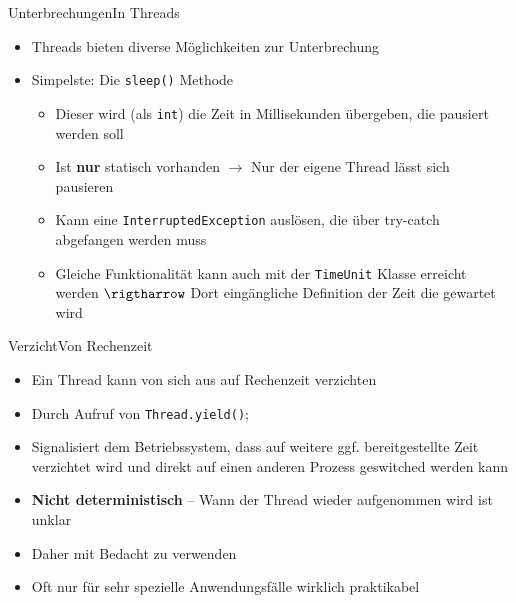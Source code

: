 \begin{frame}{Unterbrechungen}{In Threads}
    \begin{itemize}
        \item Threads bieten diverse Möglichkeiten zur Unterbrechung
        \item Simpelste: Die \texttt{sleep()} Methode
        \begin{itemize}
            \item Dieser wird (als \texttt{int}) die Zeit in Millisekunden übergeben, die pausiert werden soll
            \item Ist \textbf{nur} statisch vorhanden $\rightarrow$ Nur der eigene Thread lässt sich pausieren
            \item Kann eine \texttt{InterruptedException} auslösen, die über try-catch abgefangen werden muss
            \item Gleiche Funktionalität kann auch mit der \texttt{TimeUnit} Klasse erreicht werden $\rigtharrow$ Dort eingängliche Definition der Zeit die gewartet wird
        \end{itemize}
    \end{itemize}
\end{frame}

\begin{frame}[fragile]{\texttt{sleep()}{}
    \lstset{style=java}
\begin{lstlisting}
try {
  Thread.sleep(5000);
} catch(InterruptedException e) {}
//Alternativ:
try {
  TimeUnit.SECOND.sleep(5);
} catch(InterruptedException e) {}
\end{lstlisting}
\end{frame}

\begin{frame}{Verzicht}{Von Rechenzeit} 
    \begin{itemize}
        \item Ein Thread kann von sich aus auf Rechenzeit verzichten
        \item Durch Aufruf von \texttt{Thread.yield()};
        \item Signalisiert dem Betriebssystem, dass auf weitere ggf. bereitgestellte Zeit verzichtet wird und direkt auf einen anderen Prozess geswitched werden kann
        \item \textbf{Nicht deterministisch} -- Wann der Thread wieder aufgenommen wird ist unklar
        \item Daher mit Bedacht zu verwenden
        \item Oft nur für sehr spezielle Anwendungsfälle wirklich praktikabel
    \end{itemize}
\end{frame}


